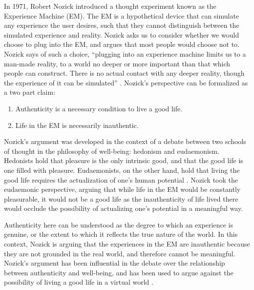 In 1971, Robert Nozick introduced a thought experiment known as the Experience
Machine (EM). The EM is a hypothetical device that can simulate any experience
the user desires, such that they cannot distinguish between the simulated
experience and reality. Nozick asks us to consider whether we would choose to
plug into the EM, and argues that most people would choose not to. Nozick says 
of such a choice, ``plugging into an experience machine limits us to a man-made
reality, to a world no deeper or more important than that which people can
construct. There is no actual contact with any deeper reality, though the
experience of it can be simulated'' \citep{Nozick1974-NOZASA}. Nozick's 
perspective can be formalized as a two part claim:
\begin{enumerate}
    \item Authenticity is a necessary condition to live a good life.
    \item Life in the EM is necessarily inauthentic.
\end{enumerate}

Nozick's argument was developed in the context of a debate between two schools 
of thought in the philosophy of well-being: hedonism and eudaemonism. Hedonists
hold that pleasure is the only intrinsic good, and that the good life is one
filled with pleasure. Eudaemonists, on the other hand, hold that living the good
life requires the actualization of one's human potential \citep{Ryan_Deci_2001}.
Nozick took the eudaemonic perspective, arguing that while life in the EM would
be constantly pleasurable, it would not be a good life as the inauthenticity of
life lived there would occlude the possibility of actualizing one's potential in
a meaningful way.

Authenticity here can be understood as the degree to which an experience is
genuine, or the extent to which it reflects the true nature of the world. In
this context, Nozick is arguing that the experiences in the EM are inauthentic
because they are not grounded in the real world, and therefore cannot be
meaningful. Nozick's argument has been influential in the debate over the
relationship between authenticity and well-being, and has been used to argue
against the possibility of living a good life in a virtual world
\citep{Slater2020}.
